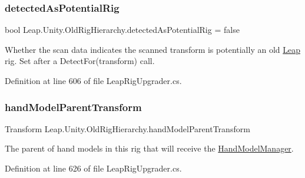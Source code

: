 \mbox{\label{class_leap_1_1_unity_1_1_old_rig_hierarchy_afd19c98916c5f3f8f2e838499d2bd872}} 
\subsubsection{\texorpdfstring{detectedAsPotentialRig}{detectedAsPotentialRig}}
{\footnotesize\ttfamily bool Leap.\+Unity.\+Old\+Rig\+Hierarchy.\+detected\+As\+Potential\+Rig = false}



Whether the scan data indicates the scanned transform is potentially an old \mbox{\hyperlink{namespace_leap_1_1_unity_1_1_leap}{Leap}} rig. Set after a Detect\+For(transform) call. 



Definition at line 606 of file Leap\+Rig\+Upgrader.\+cs.

\mbox{\label{class_leap_1_1_unity_1_1_old_rig_hierarchy_a23b887e672e43860cbe4417247cc57b9}} 
\subsubsection{\texorpdfstring{handModelParentTransform}{handModelParentTransform}}
{\footnotesize\ttfamily Transform Leap.\+Unity.\+Old\+Rig\+Hierarchy.\+hand\+Model\+Parent\+Transform}



The parent of hand models in this rig that will receive the \mbox{\hyperlink{class_leap_1_1_unity_1_1_hand_model_manager}{Hand\+Model\+Manager}}. 



Definition at line 626 of file Leap\+Rig\+Upgrader.\+cs.

\mbox{\label{class_leap_1_1_unity_1_1_old_rig_hierarchy_aa3a77f111240bc39cc8dbad463be1be4}} 
